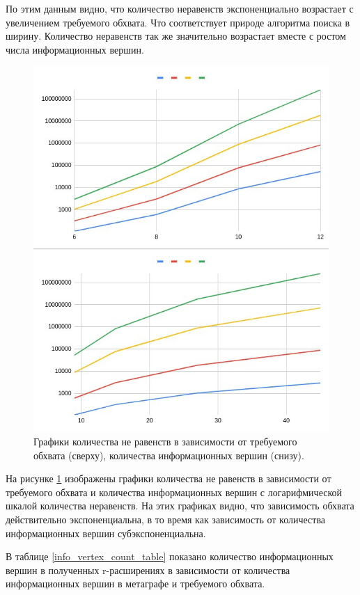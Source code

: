 \documentclass[14pt]{mmcs-article}
\begin{document}
По этим данным видно, что количество неравенств экспоненциально возрастает с увеличением требуемого обхвата. Что соответствует природе алгоритма поиска в ширину. Количество неравенств так же значительно возрастает вместе с ростом числа информационных вершин. 

\begin{figure}[H]
    \centering
    \includegraphics[scale=0.6]{eq_count_plots.jpg}
    \caption{ Графики количества не равенств в зависимости от требуемого обхвата (сверху), количества информационных вершин (снизу). }
    \label{eqs_count_plots}
\end{figure}

На рисунке \ref{eqs_count_plots} изображены графики количества не равенств в зависимости от требуемого обхвата и количества информационных вершин с логарифмической шкалой количества неравенств. На этих графиках видно, что зависимость обхвата действительно экспоненциальна, в то время как зависимость от количества информационных вершин субэкспоненциальна.

В таблице \ref{info_vertex_count_table} показано количество информационных вершин в полученных r-расширениях в зависимости от количества информационных вершин в метаграфе и требуемого обхвата.
\end{document}
